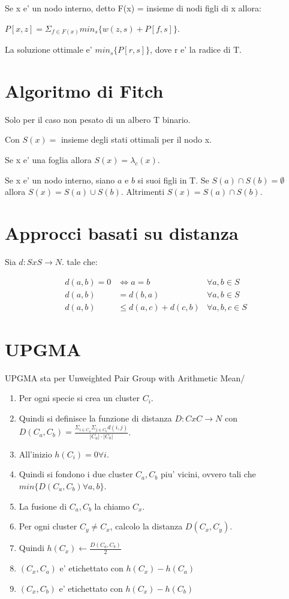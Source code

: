 Se x e' un nodo interno, detto F(x) = insieme di nodi figli di x allora:

$P[x,z] = \Sigma _ {f \in F(x)} min_s \{ w(z,s) + P[f,s] \}$.

La soluzione ottimale e' $min_s \{P[r,s]\}$, dove r e' la radice di T.

\section{Algoritmo di Fitch}

Solo per il caso non pesato di un albero T binario.

Con $S(x) = $ insieme degli stati ottimali per il nodo x.

Se x e' una foglia allora $S(x) = \lambda_c(x)$.

Se x e' un nodo interno, siano $a$ e $b$ si suoi figli in T.
Se $S(a) \cap S(b) = \emptyset$ allora $S(x) = S(a) \cup S(b)$.
Altrimenti $S(x) = S(a) \cap S(b)$.

\section{Approcci basati su distanza}

Sia $d : S x S \rightarrow N$. tale che:

\begin{align*}
    d(a,b) = 0 &\Leftrightarrow a = b &\forall a,b \in S \\
    d(a,b) &= d(b,a) & \forall a,b \in S \\
    d(a,b) &\leq d(a,c) + d(c,b) &\forall a,b,c \in S
\end{align*}

\section{UPGMA}

UPGMA sta per Unweighted Pair Group with Arithmetic Mean/

\begin{enumerate}
    \item Per ogni specie si crea un cluster $C_i$.
    \item Quindi si definisce la funzione di distanza $D : C x C \rightarrow N$ con $D(C_a,C_b) = \frac {\Sigma _ {i \in C_a} \Sigma _ {j \in C_b} d(i,j)} {|C_a| \cdot |C_b|}$.
    \item All'inizio $h(C_i) = 0 \forall i$.
    \item Quindi si fondono i due cluster $C_a,C_b$ piu' vicini, ovvero tali che $min \{ D(C_a,C_b) \forall a,b \}$.
    \item La fusione di $C_a,C_b$ la chiamo $C_x$.
    \item Per ogni cluster $C_y \ne C_x$, calcolo la distanza $D(C_x,C_y)$.
    \item Quindi $h(C_x) \gets \frac {D(C_a,C_b)} {2}$
    \item $(C_x,C_a)$ e' etichettato con $h(C_x) - h(C_a)$
    \item $(C_x,C_b)$ e' etichettato con $h(C_x) - h(C_b)$
\end{enumerate}

